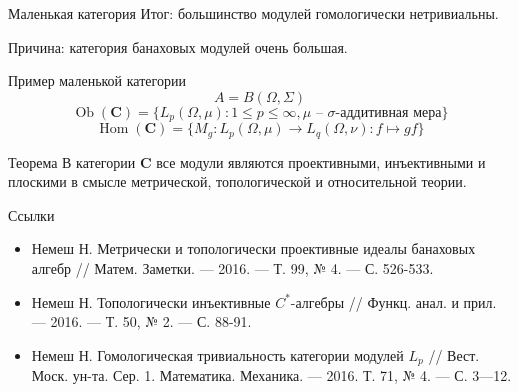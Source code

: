 \documentclass[9pt,pdf,utf8,russian]{beamer}
\begin{document}
\begin{frame}{Маленькая категория}
  \alert{Итог}: большинство модулей гомологически нетривиальны.
  \pause
  
  \alert{Причина}: категория банаховых модулей очень большая.
  \pause
  \begin{exampleblock}{Пример маленькой категории}
    \[
      A=B(\Omega,\Sigma)
    \]
    \pause
    \[
      \operatorname{Ob}(\mathbf{C})=\{L_p(\Omega,\mu): 1\leq p\leq\infty, \mu \mbox{ -- }\sigma\mbox{-аддитивная мера}\}
    \]
    \pause
    \[
      \operatorname{Hom}(\mathbf{C})=\{M_g:L_p(\Omega,\mu)\to L_q(\Omega,\nu):f\mapsto gf\}
    \]
  \end{exampleblock}
  \pause
  \begin{alertblock}{Теорема}
    В категории $\mathbf{C}$ все модули являются проективными, инъективными и плоскими в смысле метрической, топологической и относительной теории.
  \end{alertblock}  
\end{frame}


\begin{frame}{Ссылки}
  \begin{itemize}
    \item Немеш Н. Метрически и топологически проективные идеалы банаховых алгебр // Матем. Заметки.  --- 2016. --- Т. 99, № 4. --- С. 526-533.
    \item Немеш Н. Топологически инъективные $C^*$-алгебры // Функц. анал. и прил. --- 2016. --- Т. 50, № 2. --- С. 88-91.
    \item Немеш Н. Гомологическая тривиальность категории модулей $L_p$ // Вест. Моск. ун-та. Сер. 1. Математика. Механика. --- 2016. Т. 71, № 4. --- С. 3---12.
  \end{itemize}
\end{frame}





\end{document}
